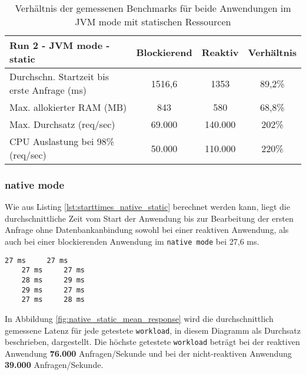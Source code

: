 \begin{table}[ht!]
    \begin{tabular}{|l | c | c | c|}
        \hline
        Run 2 - JVM mode - static & Blockierend & Reaktiv & Verhältnis \\
        \hline
        \makecell[l]{Durchschn. Startzeit bis                          \\erste Anfrage (ms)} & 1516,6      & 1353  & 89,2\%     \\
        \hline
        Max. allokierter RAM (MB) & 843         & 580     & 68,8\%     \\
        \hline
        Max. Durchsatz (req/sec)  & 69.000      & 140.000 & 202\%      \\
        \hline
        \makecell[l]{CPU Auslastung bei 98\%                           \\ (req/sec)} & 50.000 & 110.000 & 220\%  \\
        \hline
    \end{tabular}
    \caption{Verhältnis der gemessenen Benchmarks für beide Anwendungen im JVM mode mit statischen Ressourcen}
    \label{table:static_jvm_measurement_results}
\end{table}

\subsubsection{native mode}
\label{subsubsec:static_native_mode}
Wie aus Listing \ref{lst:starttimes_native_static} berechnet werden kann, liegt die durchschnittliche Zeit vom Start der Anwendung bis
zur Bearbeitung der ersten Anfrage ohne Datenbankanbindung sowohl bei einer reaktiven Anwendung, als auch bei einer blockierenden
Anwendung im \verb|native mode| bei 27,6 ms.
\begin{lstlisting}[caption=5 gemessene Startzeiten bis zur Bearbeitung der ersten Anfrage als native executables: links ist die
     reaktive Anwendung und rechts die blockierende Anwendung, captionpos=b, label=lst:starttimes_native_static]
    27 ms     27 ms
    27 ms     27 ms
    28 ms     29 ms
    29 ms     27 ms
    27 ms     28 ms
\end{lstlisting}
In Abbildung \ref{fig:native_static_mean_response} wird die durchschnittlich gemessene Latenz für jede getestete \verb|workload|,
in diesem Diagramm als Durchsatz beschrieben, dargestellt.
Die höchste getestete \verb|workload| beträgt bei der reaktiven Anwendung \textbf{76.000} Anfragen/Sekunde und bei der
nicht-reaktiven Anwendung \textbf{39.000} Anfragen/Sekunde.

